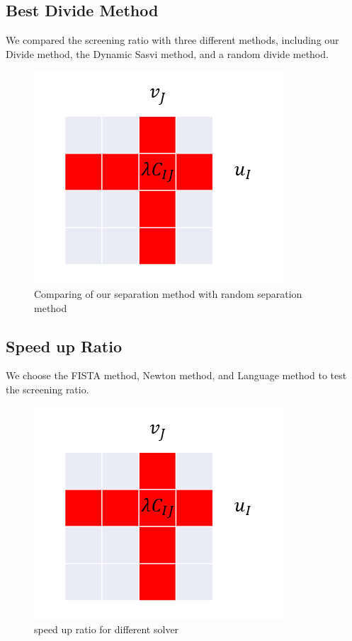 \subsection{Best Divide Method}
We compared the screening ratio with three different methods, including our Divide method, the Dynamic Sasvi method, and a random divide method. 
	\begin{figure}[h]
	\begin{center}	
	\includegraphics[width = \linewidth]{pic/divide}
	\caption{Comparing of our separation method with random separation method}
	\end{center}	
	\end{figure}

\subsection{Speed up Ratio}

We choose the FISTA method, Newton method, and Language method to test the screening ratio. 
	\begin{figure}[h]
	\begin{center}	
	\includegraphics[width = \linewidth]{pic/divide}
	\caption{speed up ratio for different solver}
	\end{center}	
	\end{figure}